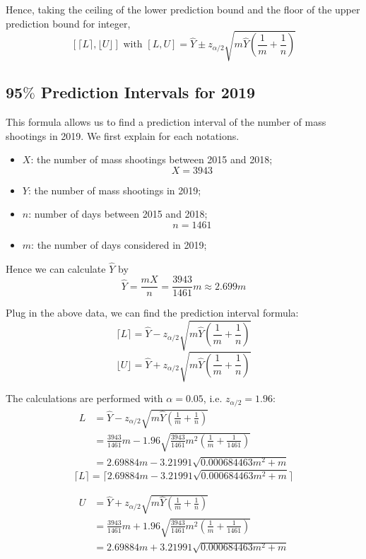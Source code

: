 \documentclass[a4paper]{article}
\begin{document}
Hence, taking the ceiling of the lower prediction bound and the floor of the upper prediction bound for integer,
$$[\lceil L \rceil,\lfloor U \rfloor] \text{ with } [L,U]=\widehat{Y}\pm z_{\alpha/2}\sqrt{m\widehat{Y}(\frac{1}{m}+\frac{1}{n})}$$

\subsection{95$\%$ Prediction Intervals for 2019}
This formula allows us to find a prediction interval of the number of mass shootings in 2019. We first explain for each notations.

\begin{itemize}
\item $X$: the number of mass shootings between 2015 and 2018;
$$X=3943$$
\item $Y$: the number of mass shootings in 2019;
\item $n$: number of days between 2015 and 2018;
$$n=1461$$
\item $m$: the number of days considered in 2019;
\end{itemize}

Hence we can calculate $\widehat{Y}$ by
$$\widehat{Y}=\frac{mX}{n}=\frac{3943}{1461}m\approx 2.699m$$

Plug in the above data, we can find the prediction interval formula:
$$\lceil L \rceil = \widehat{Y}- z_{\alpha/2}\sqrt{m\widehat{Y}(\frac{1}{m}+\frac{1}{n})}$$
$$\lfloor U \rfloor = \widehat{Y}+ z_{\alpha/2}\sqrt{m\widehat{Y}(\frac{1}{m}+\frac{1}{n})}$$

The calculations are performed with $\alpha=0.05$, i.e. $z_{\alpha/2}=1.96$:
\begin{align*}
L
&= \widehat{Y}- z_{\alpha/2}\sqrt{m\widehat{Y}(\frac{1}{m}+\frac{1}{n})}\\
&= \frac{3943}{1461}m- 1.96\sqrt{\frac{3943}{1461}m^2(\frac{1}{m}+\frac{1}{1461})}\\
&= 2.69884m - 3.21991\sqrt{0.000684463m^2 + m}
\end{align*}
$$\lceil L \rceil = \lceil 2.69884m - 3.21991\sqrt{0.000684463m^2 + m} \rceil $$

\begin{align*}
U
&= \widehat{Y}+ z_{\alpha/2}\sqrt{m\widehat{Y}(\frac{1}{m}+\frac{1}{n})}\\
&= \frac{3943}{1461}m+ 1.96\sqrt{\frac{3943}{1461}m^2(\frac{1}{m}+\frac{1}{1461})}\\
&= 2.69884m + 3.21991\sqrt{0.000684463m^2 + m}
\end{align*}
\end{document}
